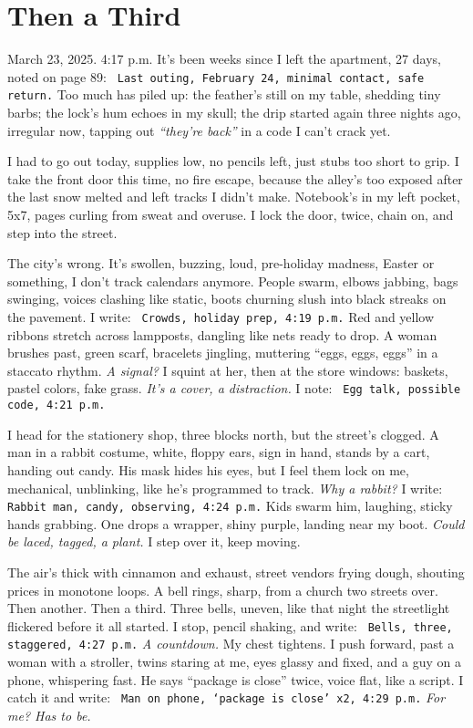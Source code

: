 \documentclass[12pt]{article} %
\newcommand{\note}[1]{\texttt{\small \color{DarkGray} #1}}
\begin{document}
\section{Then a Third}

March 23, 2025. 4:17 p.m. It’s been weeks since I left the apartment, 27 days, noted on page 89: \note{Last outing, February 24, minimal contact, safe return.} Too much has piled up: the feather’s still on my table, shedding tiny barbs; the lock’s hum echoes in my skull; the drip started again three nights ago, irregular now, tapping out \textit{“they’re back”} in a code I can’t crack yet.

I had to go out today, supplies low, no pencils left, just stubs too short to grip. I take the front door this time, no fire escape, because the alley’s too exposed after the last snow melted and left tracks I didn’t make. Notebook’s in my left pocket, 5x7, pages curling from sweat and overuse. I lock the door, twice, chain on, and step into the street.

The city’s wrong. It’s swollen, buzzing, loud, pre-holiday madness, Easter or something, I don’t track calendars anymore. People swarm, elbows jabbing, bags swinging, voices clashing like static, boots churning slush into black streaks on the pavement. I write: \note{Crowds, holiday prep, 4:19 p.m.} Red and yellow ribbons stretch across lampposts, dangling like nets ready to drop. A woman brushes past, green scarf, bracelets jingling, muttering “eggs, eggs, eggs” in a staccato rhythm. \textit{A signal?} I squint at her, then at the store windows: baskets, pastel colors, fake grass. \textit{It’s a cover, a distraction.} I note: \note{Egg talk, possible code, 4:21 p.m.}

I head for the stationery shop, three blocks north, but the street’s clogged. A man in a rabbit costume, white, floppy ears, sign in hand, stands by a cart, handing out candy. His mask hides his eyes, but I feel them lock on me, mechanical, unblinking, like he’s programmed to track. \textit{Why a rabbit?} I write: \note{Rabbit man, candy, observing, 4:24 p.m.} Kids swarm him, laughing, sticky hands grabbing. One drops a wrapper, shiny purple, landing near my boot. \textit{Could be laced, tagged, a plant.} I step over it, keep moving.

The air’s thick with cinnamon and exhaust, street vendors frying dough, shouting prices in monotone loops. A bell rings, sharp, from a church two streets over. Then another. Then a third. Three bells, uneven, like that night the streetlight flickered before it all started. I stop, pencil shaking, and write: \note{Bells, three, staggered, 4:27 p.m.} \textit{A countdown.} My chest tightens. I push forward, past a woman with a stroller, twins staring at me, eyes glassy and fixed, and a guy on a phone, whispering fast. He says “package is close” twice, voice flat, like a script. I catch it and write: \note{Man on phone, ‘package is close’ x2, 4:29 p.m.} \textit{For me? Has to be.}
\end{document}
